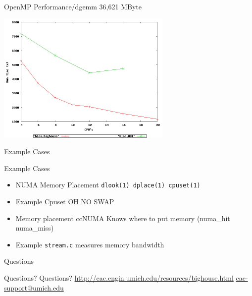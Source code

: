 \documentclass{beamer}
\begin{document}
\begin{frame}{OpenMP Performance/dgemm 36,621 MByte}
 \begin{center}\includegraphics[height=2.5in]{blas}\end{center}
\end{frame}

\begin{frame}{Example Cases}
 \begin{block}{Example Cases}
  \begin{itemize}
   \item <1-2>NUMA Memory Placement \texttt{dlook(1) dplace(1) cpuset(1)}
   \item <2>Example Cpuset OH NO SWAP
   \item <3-4>Memory placement ccNUMA Knows where to put memory (numa\_hit numa\_miss)
   \item<4> Example \texttt{stream.c} measures memory bandwidth
  \end{itemize}
 \end{block}
\end{frame}

\begin{frame}{Questions}
 \begin{block}{Questions?}
 Questions?
 \url{http://cac.engin.umich.edu/resources/bighouse.html}
 \url{cac-support@umich.edu}
 \end{block}
\end{frame}
\end{document}
